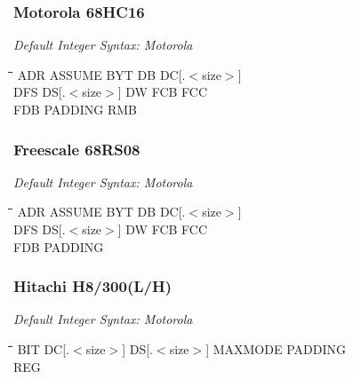\subsubsection{Motorola 68HC16}

{\em Default Integer Syntax: Motorola}

{\tt\begin{tabbing}
\hspace{3cm}\=\hspace{3cm}\=\hspace{3cm}\=\hspace{3cm}\=\kill
ADR        \> ASSUME      \> BYT         \> DB          \> DC[.$<$size$>$] \\
DFS        \> DS[.$<$size$>$] \> DW      \> FCB         \> FCC \\
FDB         \> PADDING    \> RMB \\
\end{tabbing}}

\subsubsection{Freescale 68RS08}

{\em Default Integer Syntax: Motorola}

{\tt\begin{tabbing}
\hspace{3cm}\=\hspace{3cm}\=\hspace{3cm}\=\hspace{3cm}\=\kill
ADR        \> ASSUME      \> BYT         \> DB          \> DC[.$<$size$>$] \\
DFS        \> DS[.$<$size$>$] \> DW      \> FCB         \> FCC \\
FDB         \> PADDING \\
\end{tabbing}}

\subsubsection{Hitachi H8/300(L/H)}

{\em Default Integer Syntax: Motorola}

{\tt\begin{tabbing}
\hspace{3cm}\=\hspace{3cm}\=\hspace{3cm}\=\hspace{3cm}\=\kill
BIT    \> DC[.$<$size$>$] \> DS[.$<$size$>$] \> MAXMODE     \> PADDING \\
REG    \\
\end{tabbing}}

